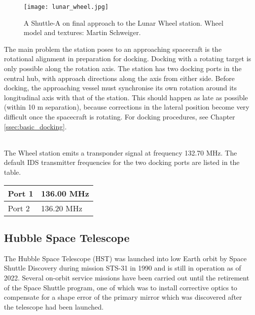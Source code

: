 \documentclass[Orbiter User Manual.tex]{subfiles}
\begin{document}
\begin{figure}[H]
  \centering
  \texttt{[image: lunar\_wheel.jpg]}
  \caption{A Shuttle-A on final approach to the Lunar Wheel station. Wheel model and textures: Martin Schweiger.}
\end{figure}

\noindent
The main problem the station poses to an approaching spacecraft is the rotational alignment in preparation for docking. Docking with a rotating target is only possible along the rotation axis. The station has two docking ports in the central hub, with approach directions along the axis from either side. Before docking, the approaching vessel must synchronise its own rotation around its longitudinal axis with that of the station. This should happen as late as possible (within 10 m separation), because corrections in the lateral position become very difficult once the spacecraft is rotating. For docking procedures, see Chapter \ref{ssec:basic_docking}.\\


\noindent
\\
The Wheel station emits a transponder signal at frequency 132.70 MHz. The default IDS transmitter frequencies for the two docking ports are listed in the table.

	\begin{longtable}{ |p{}|p{}| }
	\hline\rule{0pt}{2ex}
	Port 1 & 136.00  MHz\\
	\hline\rule{0pt}{2ex}
	Port 2 & 136.20  MHz\\
	\hline
	\end{longtable}


\subsection{Hubble Space Telescope}
The Hubble Space Telescope (HST) was launched into low Earth orbit by Space Shuttle Discovery during mission STS-31 in 1990 and is still in operation as of 2022. Several on-orbit service missions have been carried out until the retirement of the Space Shuttle program, one of which was to install corrective optics to compensate for a shape error of the primary mirror which was discovered after the telescope had been launched.
\end{document}
